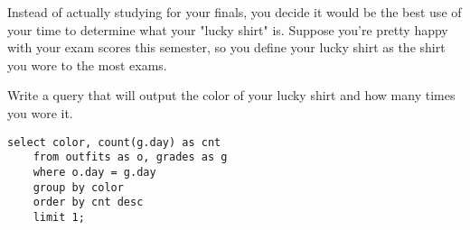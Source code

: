 \begin{blocksection}
\question 
Instead of actually studying for your finals, you decide it would be the best use of your time to determine what your "lucky shirt" is. Suppose you're pretty happy with your exam scores this semester, so you define your lucky shirt as the shirt you wore to the most exams.

Write a query that will output the color of your lucky shirt and how many times you wore it.

\begin{solution}[1.5in]
\begin{lstlisting}
select color, count(g.day) as cnt
    from outfits as o, grades as g
    where o.day = g.day 
    group by color
    order by cnt desc 
    limit 1;
\end{lstlisting}
\end{solution}
\end{blocksection}